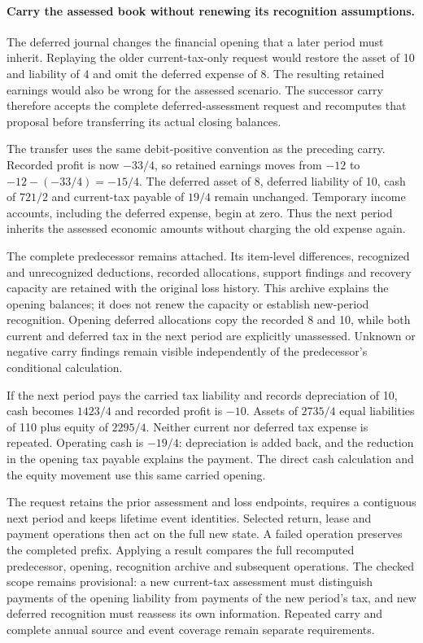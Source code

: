 

\paragraph{Carry the assessed book without renewing its recognition assumptions.}
The deferred journal changes the financial opening that a later period must
inherit. Replaying the older current-tax-only request would restore the asset
of 10 and liability of 4 and omit the deferred expense of 8. The resulting
retained earnings would also be wrong for the assessed scenario. The successor
carry therefore accepts the complete deferred-assessment request and recomputes
that proposal before transferring its actual closing balances.

The transfer uses the same debit-positive convention as the preceding carry.
Recorded profit is now $-33/4$, so retained earnings moves from $-12$ to
$-12-(-33/4)=-15/4$. The deferred asset of 8, deferred liability of 10, cash of
$721/2$ and current-tax payable of $19/4$ remain unchanged. Temporary income
accounts, including the deferred expense, begin at zero. Thus the next period
inherits the assessed economic amounts without charging the old expense again.

The complete predecessor remains attached. Its item-level differences,
recognized and unrecognized deductions, recorded allocations, support findings
and recovery capacity are retained with the original loss history. This archive
explains the opening balances; it does not renew the capacity or establish
new-period recognition. Opening deferred allocations copy the recorded 8 and
10, while both current and deferred tax in the next period are explicitly
unassessed. Unknown or negative carry findings remain visible independently of
the predecessor's conditional calculation.

If the next period pays the carried tax liability and records depreciation of
10, cash becomes $1423/4$ and recorded profit is $-10$. Assets of $2735/4$
equal liabilities of 110 plus equity of $2295/4$. Neither current nor deferred
tax expense is repeated. Operating cash is $-19/4$: depreciation is added back,
and the reduction in the opening tax payable explains the payment. The direct
cash calculation and the equity movement use this same carried opening.

The request retains the prior assessment and loss endpoints, requires a
contiguous next period and keeps lifetime event identities. Selected return,
lease and payment operations then act on the full new state. A failed operation
preserves the completed prefix. Applying a result compares the full recomputed
predecessor, opening, recognition archive and subsequent operations. The checked
scope remains provisional: a new current-tax assessment must distinguish
payments of the opening liability from payments of the new period's tax, and
new deferred recognition must reassess its own information. Repeated carry and
complete annual source and event coverage remain separate requirements.
